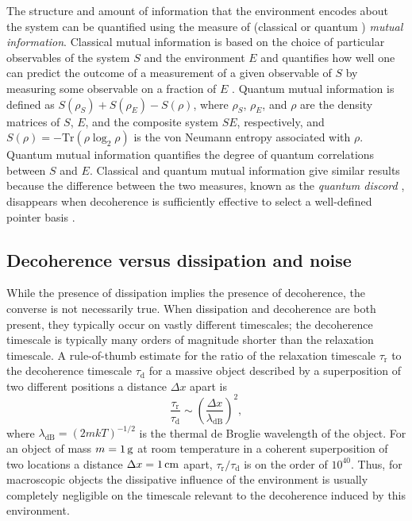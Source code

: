 \documentclass[aps,pra,reprint,amsmath,amssymb,showpacs,nofootinbib,floatfix,onecolumn,12pt]{revtex4-1}
\begin{document}
The structure and amount of information that the environment encodes about the system can be quantified using the measure of (classical \cite{Ollivier:2003:za,Ollivier:2004:im} or quantum \cite{Zurek:2002:ii,Blume:2004:oo,Blume:2005:oo}) \emph{mutual information}. Classical mutual information is based on the choice of particular observables of the system $S$ and the environment $E$ and quantifies how well one can predict the outcome of a measurement of a given observable of $S$ by measuring some observable on a fraction of $E$ \cite{Ollivier:2003:za,Ollivier:2004:im}. Quantum mutual information is defined as $S(\rho_S) + S(\rho_E) - S(\rho)$, where $\rho_S$, $\rho_E$, and $\rho$ are the density matrices of $S$, $E$, and the composite system $SE$, respectively, and $S(\rho) = - \text{Tr}\left( \rho \log_2 \rho \right)$ is the von Neumann entropy associated with $\rho$. Quantum mutual information quantifies the degree of quantum correlations between $S$ and $E$. Classical and quantum mutual information give similar results \cite{Ollivier:2003:za,Ollivier:2004:im,Zurek:2002:ii,Blume:2004:oo,Blume:2005:oo} because the difference between the two measures, known as the \emph{quantum discord} \cite{Ollivier:2001:az}, disappears when decoherence is sufficiently effective to select a well-defined pointer basis \cite{Ollivier:2001:az}. 

\subsection{\label{sec:decoh-vers-diss}Decoherence versus dissipation and noise}

While the presence of dissipation implies the presence of decoherence, the converse is not necessarily true. When dissipation and decoherence are both present, they typically occur on vastly different timescales; the decoherence timescale is typically many orders of magnitude shorter than the relaxation timescale. A rule-of-thumb estimate for the ratio of the relaxation timescale $\tau_\text{r}$ to the decoherence timescale $\tau_\text{d}$ for a massive object described by a superposition of two different positions a distance $\Delta x$ apart is \cite{Zurek:1986:uz}
%
\begin{equation}
  \label{eq:daf12}
  \frac{\tau_\text{r}}{\tau_\text{d}} \sim \left( \frac{\Delta
      x}{\lambda_\text{dB}} \right)^2,
\end{equation}
%
where $\lambda_\text{dB}=(2mkT)^{-1/2}$ is the thermal de Broglie wavelength of the object. For an object of mass $m = \unit[1]{g}$ at room temperature in a coherent superposition of two locations a distance $\Delta x =\unit[1]{cm}$ apart, $\tau_\text{r}/\tau_\text{d}$ is on the order of $10^{40}$. Thus, for macroscopic objects the dissipative influence of the environment is usually completely negligible on the timescale relevant to the decoherence induced by this environment. 
\end{document}
